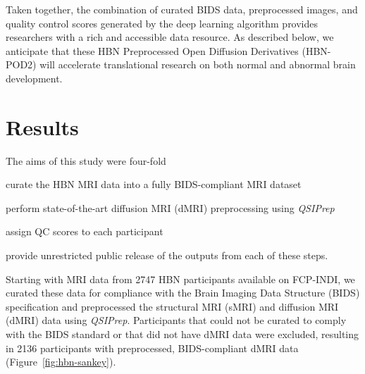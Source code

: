\documentclass[9pt,lineno]{elife}
\begin{document}
Taken together, the combination of curated BIDS data, preprocessed images, and quality control scores generated by the deep learning algorithm provides researchers with a rich and accessible data resource. As described below, we anticipate that these HBN Preprocessed Open Diffusion Derivatives (HBN-POD2) will accelerate translational research on both normal and abnormal brain development.

\section{Results}

The aims of this study were four-fold
\begin{enumerate*}[%
    label=(\roman*),%
    before=\unskip{: },%
    itemjoin={{, }},%
    itemjoin*={{, and }}]
    \item curate the HBN MRI data into a fully BIDS-compliant MRI dataset
    \item perform state-of-the-art diffusion MRI (dMRI) preprocessing using \emph{QSIPrep}
    \item assign QC scores to each participant
    \item provide unrestricted public release of the outputs from each of these
    steps.
\end{enumerate*}
Starting with MRI data from \num{2747} HBN participants available on FCP-INDI,
we curated these data for compliance with the Brain Imaging Data Structure
(BIDS) specification \citep{gorgolewski2016-lh} and preprocessed the structural
MRI (sMRI) and diffusion MRI (dMRI) data using \emph{QSIPrep}. Participants that
could not be curated to comply with the BIDS standard or that did not have dMRI
data were excluded, resulting in \num{2136} participants with preprocessed,
BIDS-compliant dMRI data (Figure~\ref{fig:hbn-sankey}).
\end{document}
